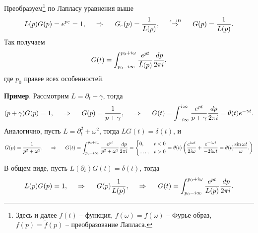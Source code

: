 Преобразуем\footnote{
    Здесь и далее $f(t)$ -- функция, $f(\omega) = \hat{f}(\omega)$ -- Фурье образ, $f(p) = \tilde{f}(p)$ -- преобразование Лапласа.
}  по Лапласу уравнения выше
\begin{equation*}
     L(p) G(p) = e^{p \varepsilon} = 1,
     \hspace{0.5cm} \Rightarrow \hspace{0.5cm}
     G_\varepsilon (p) = \frac{1}{L(p)},
     \hspace{0.5cm} \overset{\varepsilon \to 0}{\Rightarrow}  \hspace{0.5cm}
     G(p) = \frac{1}{L(p)}.
 \end{equation*} 
Так получаем
\begin{equation}
    G(t) = \int_{p_0 - i \infty}^{p_0 + i \omega} \frac{e^{pt}}{\tilde{L}(p)} \frac{\, d p}{2\pi i},
\end{equation}
где $p_0$ правее всех особенностей. 




\textbf{Пример}. Рассмотрим $L = \partial_t + \gamma$, тогда
\begin{equation*}
    (p+\gamma) G(p) = 1,
    \hspace{0.5cm} \Rightarrow \hspace{0.5cm}
    G(p) = \frac{1}{p + \gamma},
    \hspace{0.5cm} \Rightarrow \hspace{0.5cm}
    G(t) = \int_{-i \infty}^{i \infty} \frac{e^{pt}}{p+\gamma} \frac{\, d p}{2 \pi i} = \theta(t) e^{- \gamma t}.
\end{equation*}
Аналогично, пусть $L = \partial_t^2 + \omega^2$, тогда $L G(t) = \delta(t)$, и
\begin{equation*}
    G(p) = \frac{1}{p^2 + \omega^2},
    \hspace{0.5cm} \Rightarrow \hspace{0.5cm}
    G(t) = \int_{p_0 - i \infty}^{p_0 + i \omega} \frac{e^{pt}}{p^2 + \omega^2} \frac{\, d p}{2 \pi i} = 
    \left\{\begin{aligned}
        &0, &t < 0 \\
        &\ldots, &t>0
    \end{aligned}\right. 
    = \theta(t) \left(
        \frac{e^{i \omega t}}{2 i \omega} + \frac{e^{- i \omega t}}{- 2 i \omega t} = \theta(t) \frac{\sin \omega t}{\omega}.
    \right)
\end{equation*}

В общем виде, пусть $L(\partial_t) G(t) = \delta(t)$, тогда
\begin{equation*}
    L(p) G(p) = 1,
    \hspace{0.5cm} \Rightarrow \hspace{0.5cm}
    G(p) \frac{1}{L(p)},
    \hspace{0.5cm} \Rightarrow \hspace{0.5cm}
    G(t) = \int_{p_0 - i \infty}^{p_0 + i \omega} \frac{e^{p t}}{L(p)} \frac{\, d p}{2 \pi i}.
\end{equation*}

